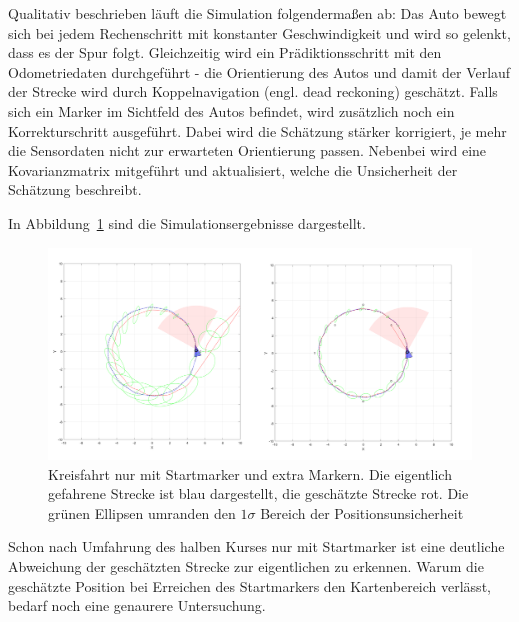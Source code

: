 Qualitativ beschrieben läuft die Simulation folgendermaßen ab:
Das Auto bewegt sich bei jedem Rechenschritt mit konstanter Geschwindigkeit und wird so gelenkt, dass es der Spur folgt. Gleichzeitig wird ein Prädiktionsschritt mit den Odometriedaten durchgeführt - die Orientierung des Autos und damit der Verlauf der Strecke wird durch Koppelnavigation (engl. dead reckoning) geschätzt.
Falls sich ein Marker im Sichtfeld des Autos befindet, wird zusätzlich noch ein Korrekturschritt ausgeführt. Dabei wird die Schätzung stärker korrigiert, je mehr die Sensordaten nicht zur erwarteten Orientierung passen. Nebenbei wird eine Kovarianzmatrix mitgeführt und aktualisiert, welche die Unsicherheit der Schätzung beschreibt.

In Abbildung~\ref{fig:simulation} sind die Simulationsergebnisse dargestellt.

\begin{figure}[h]
	\centering
    \includegraphics[width=.75\linewidth]{Figures/2.png}
	\caption{Kreisfahrt nur mit Startmarker und extra Markern. Die eigentlich gefahrene Strecke ist blau dargestellt, die geschätzte Strecke rot. Die grünen Ellipsen umranden den $1\sigma$ Bereich der Positionsunsicherheit}
	\label{fig:simulation}
\end{figure}

Schon nach Umfahrung des halben Kurses nur mit Startmarker ist eine deutliche Abweichung der geschätzten Strecke zur eigentlichen zu erkennen. Warum die geschätzte Position bei Erreichen des Startmarkers den Kartenbereich verlässt, bedarf noch eine genaurere Untersuchung.